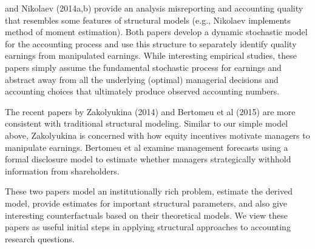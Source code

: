 \citet{Gerakos:2013cl} and Nikolaev (2014a,b) provide an analysis misreporting and accounting quality that resembles some features of structural models (e.g., Nikolaev implements method of moment estimation).
Both papers develop a dynamic stochastic model for the accounting process and use this structure to separately identify quality earnings from manipulated earnings.
While interesting empirical studies, these papers simply assume the fundamental stochastic process for earnings and abstract away from all the underlying (optimal) managerial decisions and accounting choices that ultimately produce observed accounting numbers. 

The recent papers by Zakolyukina (2014) and Bertomeu et al (2015) are more consistent with traditional structural modeling.  Similar to our simple model above, Zakolyukina is concerned with how equity incentives motivate managers to manipulate earnings.  Bertomeu et al examine management forecasts using a formal disclosure model to estimate whether managers strategically withhold information from shareholders.

These two papers model an institutionally rich problem, estimate the derived model, provide estimates for important structural parameters, and also give interesting counterfactuals based on their theoretical models.  
We view these papers as useful initial steps in applying structural approaches to accounting research questions.

